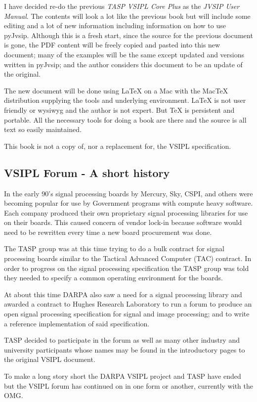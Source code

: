 I have decided re-do the previous \emph{TASP VSIPL Core Plus} as the \emph{JVSIP User Manual}. The contents will look a lot like the previous book but will include some editing and a lot of new information including information on how to use pyJvsip.  Although this is a fresh start, since the source for the previous document is gone, the PDF content will be freely copied and pasted into this new document; many of the examples will be the same except updated and versions written in pyJvsip; and the author considers this document to be an update of the original. 

The new document will be done using LaTeX on a Mac with the MacTeX distribution supplying the tools and underlying environment.  LaTeX is not user friendly or wysiwyg and the author is not expert. But TeX is persistent and portable. All the necessary tools for doing a book are there and the source is all text so easily maintained. 

This book is not a copy of, nor a replacement for, the VSIPL specification.
\subsection*{VSIPL Forum - A short history}
In the early 90's signal processing boards by Mercury, Sky, CSPI, and others were becoming popular for use by Government  programs with compute heavy software.  Each company produced their own proprietary signal processing libraries for use on their boards. This caused concern of vendor lock-in because software would need to be rewritten every time a new board procurement was done.

The TASP group was at this time trying to do a bulk contract for signal processing boards similar to the Tactical Advanced Computer (TAC) contract.  In order to progress on the signal processing specification the TASP group was told they needed to specify a common operating environment for the boards. 

At about this time DARPA also saw a need for a signal processing library and awarded a contract to Hughes Research Laboratory to run a forum to produce an open signal processing specification for signal and image processing; and to write a reference implementation of said specification. 

TASP decided to participate in the forum as well as many other industry and university participants whose names may be found in the introductory pages to the original VSIPL document.

To make a long story short the DARPA VSIPL project and TASP have ended but the VSIPL forum has continued on in one form or another, currently with the OMG.  


